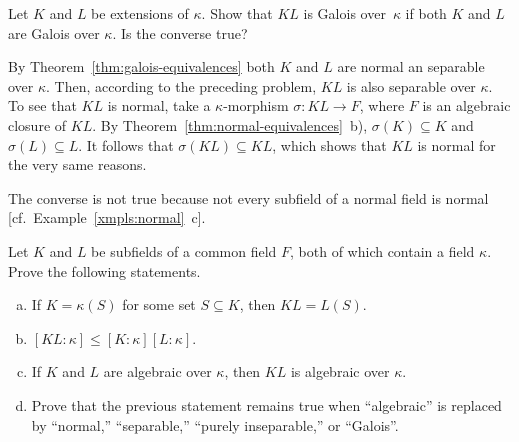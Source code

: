 \begin{probl}\label{probl:galois.galois=galois}
    Let\/ $K$ and\/ $L$ be extensions of\/ $\kappa$. Show that\/ $KL$ is Galois over\/~$\kappa$ if both\/ $K$ and\/ $L$ are Galois over\/ $\kappa$. Is the converse true?
\end{probl}

\begin{solution}
    By Theorem~\ref{thm:galois-equivalences} both $K$ and $L$ are normal an separable over $\kappa$. Then, according to the preceding problem, $KL$ is also separable over $\kappa$. To see that $KL$ is normal, take a $\kappa$-morphism $\sigma\colon KL\to F$, where $F$ is an algebraic closure of $KL$. By Theorem~\ref{thm:normal-equivalences}~b), $\sigma(K)\subseteq K$ and $\sigma(L)\subseteq L$. It follows that $\sigma(KL)\subseteq KL$, which shows that $KL$ is normal for the very same reasons.

    The converse is not true because not every subfield of a normal field is normal [cf.~Example~\ref{xmpls:normal}~c].
\end{solution}

\begin{probl}\label{probl:KL}
    Let\/ $K$ and\/ $L$ be subfields of a common field $F$, both of which contain a field\/ $\kappa$. Prove the following statements.
    \begin{enumerate}[a), font=\upshape]
        \item If\/ $K = \kappa(S)$ for some set\/ $S \subseteq K$, then\/ $KL = L(S)$.
        \item $[KL: \kappa] \leq [K: \kappa][L : \kappa]$.
        \item If\/ $K$ and\/ $L$ are algebraic over\/ $\kappa$, then\/ $KL$ is algebraic over\/ $\kappa$.
        \item Prove that the previous statement remains true when ``algebraic'' is replaced by ``normal,'' ``separable,'' ``purely inseparable,'' or ``Galois''.
    \end{enumerate}
\end{probl}

